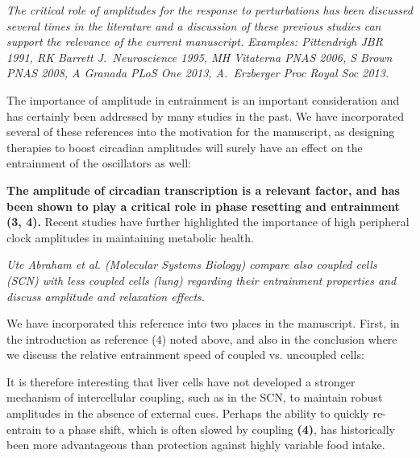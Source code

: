 \documentclass[11pt, letterpaper]{article}
\newenvironment{reviewer}{\itshape\color{gray}}{}
\newenvironment{manuscript}[1]{\begin{center}\begin{tcolorbox}[colback=green!5!white,colframe=green!75!black,width=0.8\textwidth,title={#1},breakable,fonttitle=\bfseries]}{\end{tcolorbox}\end{center}}
\begin{document}
\begin{reviewer}
The critical role of amplitudes for the response to perturbations has been discussed several times in the literature and a discussion of these previous studies can support the relevance of the current manuscript.
Examples: Pittendrigh JBR 1991, RK Barrett J.~Neuroscience 1995, MH Vitaterna PNAS 2006, S Brown PNAS 2008, A Granada PLoS One 2013, A.~Erzberger Proc Royal Soc 2013.

\end{reviewer}

The importance of amplitude in entrainment is an important consideration and has certainly been addressed by many studies in the past.
We have incorporated several of these references into the motivation for the manuscript, as designing therapies to boost circadian amplitudes will surely have an effect on the entrainment of the oscillators as well:

\begin{manuscript}{Page 2}
  {\bfseries The amplitude of circadian transcription is a relevant factor, and has been shown to play a critical role in phase resetting and entrainment (3, 4).}
Recent studies have further highlighted the importance of high peripheral clock amplitudes in maintaining metabolic health.
\end{manuscript}

\begin{reviewer}
Ute Abraham et al. (Molecular Systems Biology) compare also coupled cells (SCN) with less coupled cells (lung) regarding their entrainment properties and discuss amplitude and relaxation effects.
\end{reviewer}

We have incorporated this reference into two places in the manuscript. First, in the introduction as reference (4) noted above, and also in the conclusion where we discuss the relative entrainment speed of coupled vs. uncoupled cells:

\begin{manuscript}{Page 18}
It is therefore interesting that liver cells have not developed a stronger mechanism of intercellular coupling, such as in the SCN, to maintain robust amplitudes in the absence
of external cues.
Perhaps the ability to quickly re-entrain to a phase shift, which is often slowed by coupling {\bfseries (4)}, has historically been more advantageous than protection against highly variable food intake.
\end{manuscript}
\end{document}
